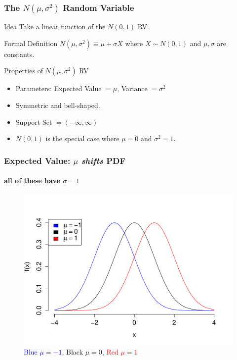 \documentclass[handout]{beamer}
\begin{document}
\begin{frame}
  \frametitle{The $N(\mu, \sigma^2)$ Random Variable}
  \begin{block}{Idea}
   Take a linear function of the $N(0,1)$ RV.
  \end{block}
  \begin{block}{Formal Definition}
    \alert{$N(\mu, \sigma^2) \equiv \mu + \sigma X$} where $X \sim N(0,1)$ and $\mu, \sigma$ are constants.
  \end{block}
  \begin{block}{Properties of $N(\mu, \sigma^2)$ RV}
    \begin{itemize}
      \item Parameters: Expected Value $= \mu$, Variance $= \sigma^2$
      \item Symmetric and bell-shaped. 
      \item Support Set $=(-\infty,\infty)$
      \item $N(0,1)$ is the special case where $\mu=0$ and $\sigma^2 = 1$. 
    \end{itemize}
  \end{block}
\end{frame}
\begin{frame}
  \frametitle{Expected Value: $\mu$ \emph{shifts} PDF}
\framesubtitle{all of these have $\sigma=1$}

\begin{figure}
\includegraphics[scale = 0.5]{./images/normal_means}
\caption{\textcolor{blue}{Blue $\mu = -1$},
Black $\mu = 0$,
\textcolor{red}{Red $\mu = 1$}}
\end{figure}
\end{frame}
\end{document}
